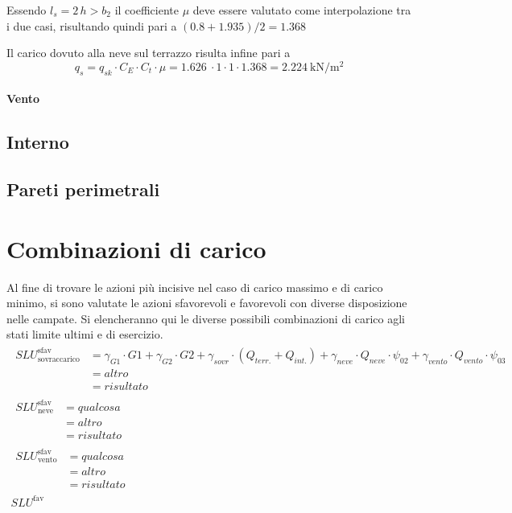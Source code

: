 Essendo $l_s=2\,h>b_2$ il coefficiente $\mu$ deve essere valutato come interpolazione tra i due casi, risultando quindi pari a $(0.8 + 1.935)/2 = 1.368$

Il carico dovuto alla neve sul terrazzo risulta infine pari a 
\[q_s = q_{sk} \cdot C_E \cdot C_t \cdot \mu = \SI{1.626}{} \cdot 1 \cdot 1 \cdot 1.368 = \SI{2.224}{\kilo\newton\per\square\meter}\]

\paragraph*{Vento}
\subsection{Interno}
\subsection{Pareti perimetrali}

\section{Combinazioni di carico}
Al fine di trovare le azioni più incisive nel caso di carico massimo e di carico minimo, si sono valutate le azioni sfavorevoli e favorevoli con diverse disposizione nelle campate. 
Si elencheranno qui le diverse possibili combinazioni di carico agli stati limite ultimi e di esercizio.
\begin{align}
	\begin{split}
	SLU^{\text{sfav}}_{\text{sovraccarico}} &= \gamma_{G1}\cdot G1 + \gamma_{G2} \cdot G2 + \gamma_{sovr} \cdot (Q_{terr.} + Q_{int.}) + \gamma_{neve}\cdot Q_{neve}\cdot\psi_{02} + \gamma_{vento}\cdot Q_{vento} \cdot \psi_{03}  \\
											&= altro \\
											&= risultato
	\end{split} \\
	\begin{split}
	SLU^{\text{sfav}}_{\text{neve}} &= qualcosa \\
									&= altro \\
									&= risultato
	\end{split} \\
	\begin{split}
	SLU^{\text{sfav}}_{\text{vento}}&= qualcosa \\
									&= altro \\
									&= risultato
	\end{split} \\
	SLU^{\text{fav}}	
\end{align}


